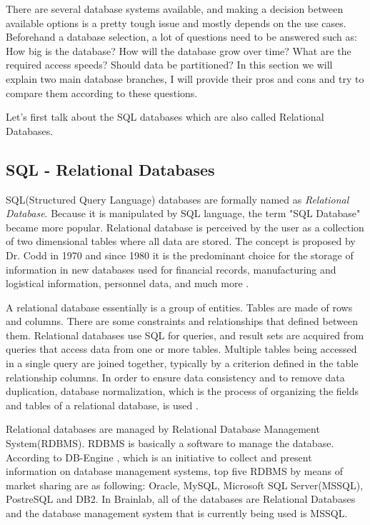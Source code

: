 \documentclass{article}
\begin{document}
There are several database systems available, and making a decision between available options is a pretty tough issue and mostly depends on the use cases. Beforehand a database selection, a lot of questions need to be answered such as: How big is the database? How will the database grow over time? What are the required access speeds? Should data be partitioned? In this section we will explain two main database branches, I will provide their pros and cons and try to compare them according to these questions.

Let's first talk about the SQL databases which are also called Relational Databases. 

\subsection{SQL - Relational Databases}
SQL(Structured Query Language) databases are formally named as \emph{Relational Database}. Because it is manipulated by SQL language, the term "SQL Database" became more popular. Relational database is perceived by the user as a collection of two dimensional tables where all data are stored. The concept is proposed by Dr. Codd in 1970 and since 1980 it is the predominant choice for the storage of information in new databases used for financial records, manufacturing and logistical information, personnel data, and much more \cite{online1}. 

A relational database essentially is a group of entities. Tables are made of rows and columns. There are some constraints and relationships that defined between them. Relational databases use SQL for queries, and result sets are acquired from queries that access data from one or more tables. Multiple tables being accessed in a single query are joined together, typically by a criterion defined in the table relationship columns. In order to ensure data consistency and to remove data duplication, database normalization, which is the process of organizing the fields and tables of a relational database, is used \cite{clouddb2}.  

Relational databases are managed by Relational Database Management System(RDBMS). RDBMS is basically a software to manage the database.  According to DB-Engine \cite{online2}, which is an initiative to collect and present information on database management systems, top five RDBMS by means of market sharing are as following: Oracle, MySQL, Microsoft SQL Server(MSSQL), PostreSQL and DB2. In Brainlab, all of the databases are Relational Databases and the database management system that is currently being used is MSSQL.
\end{document}
